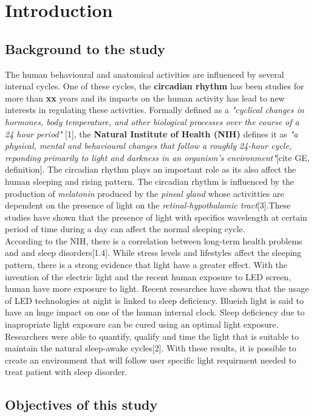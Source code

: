 \chapter{Introduction}

\section{Background to the study}
The human behavioural and anatomical activities are influenced by several internal cycles. One of these cycles, the \textbf{circadian rhythm} has been studies for more than \textbf{xx} years and its impacts on the human activity has lead to new interests in regulating these activities. Formally defined as a \textit{"cyclical changes in hormones, body temperature, and other biological processes over the course of a 24 hour period"} [1], the \textbf{Natural Institute of Health (NIH)} defines it as \textit{"a physical, mental and behavioural changes that follow a roughly 24-hour cycle, reponding primarily to light and darkness in an organism's environment"}[cite GE, definition]. The circadian rhythm plays an important role as its also affect the human sleeping and rising pattern. The circadian rhythm is influenced by the production of \textit{melatonin} produced by the \textit{pineal gland} whose activitties are dependent on the presence of light on the \textit{retinal-hypothalamic tract}[3].These studies have shown that the presence of light with specifics wavelength at certain period of time during a day can affect the normal sleeping cycle.\\   
According to the NIH, there is a correlation between long-term health problems and and sleep disorders[1.4]. While stress levels and lifestyles affect the sleeping pattern, there is a strong evidence that light have a greater effect. With the invention of the electric light and the recent human exposure to LED screen, human have more exposure to light. Recent researches have shown that the usage of LED technologies at night is linked to sleep deficiency. Blueish light is said to have an huge impact on one of the human internal clock. Sleep deficiency due to inapropriate light exposure can be cured using an optimal light exposure. Researchers were able to quantify, qualify and time the light that is suitable to maintain the natural sleep-awake cycles[2]. With these results, it is possible to create an environment that will follow user specific light requirment needed to treat patient with sleep disorder.

\section{Objectives of this study}
